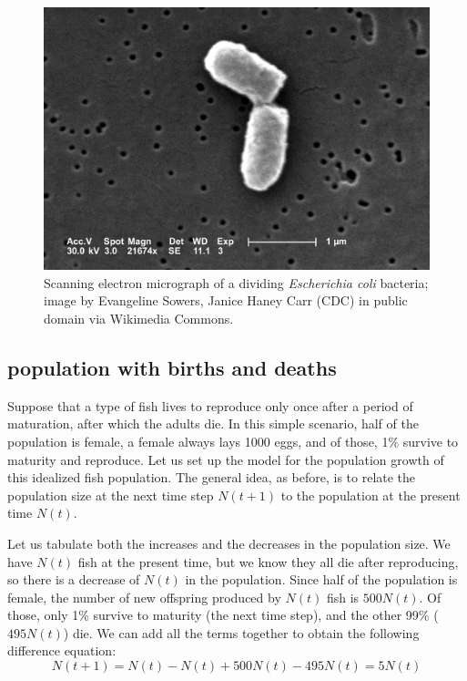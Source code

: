 \documentclass[
]{book}
\theoremstyle{definition}
\theoremstyle{definition}
\theoremstyle{definition}
\theoremstyle{remark}
\begin{document}
\begin{figure}
\centering
\includegraphics{ch14/Ecoli_dividing.png}
\caption{Scanning electron micrograph of a dividing \emph{Escherichia coli} bacteria; image by Evangeline Sowers, Janice Haney Carr (CDC) in public domain via Wikimedia Commons.}
\end{figure}

\hypertarget{population-with-births-and-deaths}{%
\subsection{population with births and deaths}\label{population-with-births-and-deaths}}

Suppose that a type of fish lives to reproduce only once after a period of maturation, after which the adults die. In this simple scenario, half of the population is female, a female always lays 1000 eggs, and of those, 1\% survive to maturity and reproduce. Let us set up the model for the population growth of this idealized fish population. The general idea, as before, is to relate the population size at the next time step \(N(t+1)\) to the population at the present time \(N(t)\).

Let us tabulate both the increases and the decreases in the population size. We have \(N(t)\) fish at the present time, but we know they all die after reproducing, so there is a decrease of \(N(t)\) in the population. Since half of the population is female, the number of new offspring produced by \(N(t)\) fish is \(500N(t)\). Of those, only 1\% survive to maturity (the next time step), and the other 99\% (\(495N(t)\)) die. We can add all the terms together to obtain the following difference equation:
\[ 
N(t+1) = N(t) - N(t) + 500N(t) - 495 N(t)  = 5N(t)
\]
\end{document}
